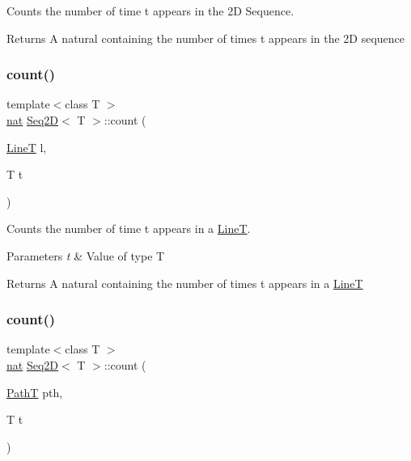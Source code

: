 Counts the number of time t appears in the 2D Sequence. 

\begin{DoxyReturn}{Returns}
A natural containing the number of times t appears in the 2D sequence 
\end{DoxyReturn}
\mbox{\label{class_seq2_d_ac57bbdcbb5d743363ce464acd6286eff}} 
\subsubsection{\texorpdfstring{count()}{count()}\hspace{0.1cm}{\footnotesize\ttfamily [2/3]}}
{\footnotesize\ttfamily template$<$class T $>$ \\
\mbox{\hyperlink{_path_a_d_t_8h_a56638ee9d162e8cce3a15f92d2023d6e}{nat}} \mbox{\hyperlink{class_seq2_d}{Seq2D}}$<$ T $>$\+::count (\begin{DoxyParamCaption}\item[{\mbox{\hyperlink{class_line_t}{LineT}}}]{l,  }\item[{T}]{t }\end{DoxyParamCaption})}



Counts the number of time t appears in a \mbox{\hyperlink{class_line_t}{LineT}}. 


\begin{DoxyParams}{Parameters}
{\em t} & Value of type T \\
\hline
\end{DoxyParams}
\begin{DoxyReturn}{Returns}
A natural containing the number of times t appears in a \mbox{\hyperlink{class_line_t}{LineT}} 
\end{DoxyReturn}
\mbox{\label{class_seq2_d_a81e5e36a3928888b4dbc8732ac3e8d5f}} 
\subsubsection{\texorpdfstring{count()}{count()}\hspace{0.1cm}{\footnotesize\ttfamily [3/3]}}
{\footnotesize\ttfamily template$<$class T $>$ \\
\mbox{\hyperlink{_path_a_d_t_8h_a56638ee9d162e8cce3a15f92d2023d6e}{nat}} \mbox{\hyperlink{class_seq2_d}{Seq2D}}$<$ T $>$\+::count (\begin{DoxyParamCaption}\item[{\mbox{\hyperlink{class_path_t}{PathT}}}]{pth,  }\item[{T}]{t }\end{DoxyParamCaption})}



